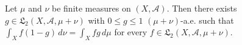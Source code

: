 Let $\mu$ and $\nu$ be finite measures on $(X, \mathcal{A})$. Then there exists $g \in \mathfrak{L}_2(X, \mathcal{A}, \mu + \nu)$ with $0 \leq g \leq 1$ $(\mu+\nu)$-a.e. such that $\int_X f(1 - g) \, d\nu = \int_X f g \, d\mu$ for every $f \in \mathfrak{L}_2(X, \mathcal{A}, \mu + \nu)$.
